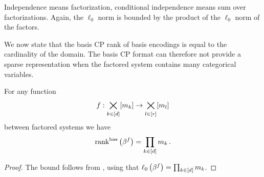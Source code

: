 \begin{example}
    Independence means factorization, conditional independence means sum over factorizations.
    Again, the $\ell_0$ norm is bounded by the product of the $\ell_0$ norm of the factors.
\end{example}






We now state that the basis CP rank of basis encodings is equal to the cardinality of the domain.
The basis CP format can therefore not provide a sparse representation when the factored system contains many categorical variables.


\begin{theorem}
    \label{the:rencodingBasCP}
    For any function
    \[ f : \bigtimes_{k\in[d]}[m_{k}] \rightarrow  \bigtimes_{l\in[r]}[m_{l}] \]
    between factored systems we have
    \[ \mathrm{rank}^{\mathrm{bas}}\left(\beta^{f}\right) =  \prod_{k\in[d]}m_{k} \, . \]
\end{theorem}
\begin{proof}
    The bound follows from , using that $\ell_0\left(\beta^{f}\right)=\prod_{k\in[d]}m_{k}$.
\end{proof}

